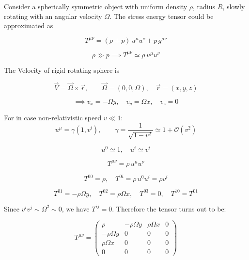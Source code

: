 \documentclass[12pt, a4paper]{article}
\theoremstyle{plain}
\theoremstyle{definition}
\theoremstyle{remark}
\begin{document}
Consider a spherically symmetric object with uniform density $\rho$, radius $R$, slowly rotating with an angular velocity $\Omega$. The stress energy tensor could be approximated as

\begin{equation}
    T^{\mu\nu} = (\rho + p)\, u^\mu u^\nu + p\, g^{\mu\nu}
\end{equation}

\begin{equation}
    \rho \gg p \implies T^{\mu\nu} \simeq \rho\, u^\mu u^\nu
\end{equation}

The Velocity of rigid rotating sphere is

\begin{equation}
    \vec{V} = \vec{\Omega} \times \vec{r}, \qquad \vec{\Omega} = (0,0,\Omega), \quad \vec{r} = (x,y,z)
\end{equation}

\begin{equation}
    \implies v_x = -\Omega y, \quad v_y = \Omega x, \quad v_z = 0
\end{equation}

For in case non-relativistic speed $v \ll 1$:
\begin{equation}
    u^\mu = \gamma(1, v^i), \qquad \gamma = \frac{1}{\sqrt{1-v^2}} \simeq 1 + \mathcal{O}(v^2)
\end{equation}

\begin{equation}
    u^0 \simeq 1, \quad u^i \simeq v^i
\end{equation}

\begin{equation}
    T^{\mu\nu} = \rho\, u^\mu u^\nu
\end{equation}

\begin{equation}
    T^{00} = \rho, \quad T^{0i} = \rho\, u^0 u^i = \rho v^i
\end{equation}

\begin{equation}
    T^{01} = -\rho\Omega y, \quad T^{02} = \rho\Omega x, \quad T^{03} = 0, \quad T^{10} = T^{01}
\end{equation}

Since $v^i v^j \sim \Omega^2 \sim 0$, we have $T^{ij} = 0$. Therefore  the tensor turns out to be:

\begin{equation}
    T^{\mu\nu} =
    \begin{pmatrix}
        \rho & -\rho\Omega y & \rho\Omega x & 0 \\
        -\rho\Omega y & 0 & 0 & 0 \\
        \rho\Omega x & 0 & 0 & 0 \\
        0 & 0 & 0 & 0
    \end{pmatrix}
\end{equation}
\end{document}
